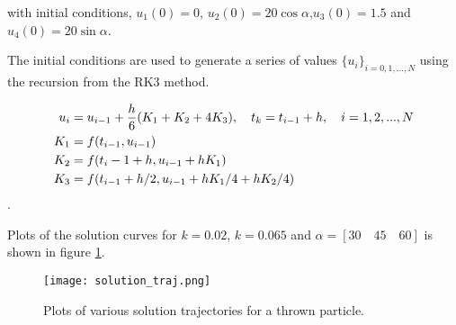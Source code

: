 \documentclass[11pt,a4paper,roman]{scrartcl}
\begin{document}
with initial conditions, $u_1(0)=0$, $u_2(0)=20\cos\alpha$,$u_3(0)=1.5$ and $u_4(0)=20\sin\alpha$.

The initial conditions are used to generate a series of values $\{u_i\}_{i=0,1,...,N}$ using the recursion from the RK3 method.

\begin{equation}
\begin{aligned}
\centering
u_i & =u_{i-1}+\frac{h}{6}(K_1+K_2+4K_3),\quad t_k=t_{i-1}+h, \quad i=1,2, ..., N \\
K_1 & =f(t_{i-1},u_{i-1})\\
K_2 & =f(t{_i-1}+h,u_{i-1}+hK_1)\\
K_3 & =f(t_{i-1}+h/2,u_{i-1}+hK_1/4+hK_2/4) 
\end{aligned}
\end{equation}.



Plots of the solution curves for $k=0.02$, $k=0.065$ and $\alpha=[30\quad45\quad 60]$ is shown in figure \ref*{soltraj}.

\begin{figure}
\centering
\texttt{[image: solution\_traj.png]}
\caption{Plots of various solution trajectories for a thrown particle.}
\label{soltraj}
\end{figure}
\end{document}
